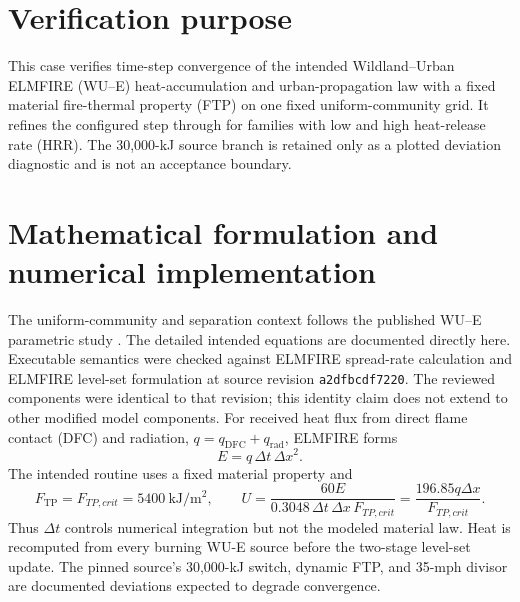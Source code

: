 \section{Verification purpose}

This case verifies time-step convergence of the intended Wildland--Urban ELMFIRE (WU--E) heat-accumulation and urban-propagation law with a fixed material fire-thermal property (FTP) on one fixed uniform-community grid. It refines the configured step through \TimeStepSet{} for families with low and high heat-release rate (HRR). The 30,000-kJ source branch is retained only as a plotted deviation diagnostic and is not an acceptance boundary.

\ReportOverview

\section{Mathematical formulation and numerical implementation}
The uniform-community and separation context follows the published WU--E
parametric study \cite{PurnomoIJWF2024}. The detailed intended equations are
documented directly here.
Executable semantics were checked against ELMFIRE spread-rate calculation
and ELMFIRE level-set formulation at source revision
\texttt{a2dfbcdf7220}.  The reviewed components were identical to that revision; this identity claim
does not extend to other modified model components.
For received heat flux from direct flame contact (DFC) and radiation, $q=q_{\mathrm{DFC}}+q_{\mathrm{rad}}$, ELMFIRE forms
\begin{equation}
 E=q\,\Delta t\,\Delta x^2.
\end{equation}
The intended routine uses a fixed material property and
\begin{equation}
 F_{\mathrm{TP}}=F_{TP,crit}=5400~\si{\kilo\joule\per\square\metre},\qquad
 U=\frac{60E}{0.3048\,\Delta t\,\Delta x\,F_{TP,crit}}
  =\frac{196.85q\Delta x}{F_{TP,crit}}.
\end{equation}
Thus $\Delta t$ controls numerical integration but not the modeled material
law. Heat is recomputed from every burning WU-E source before the two-stage
level-set update. The pinned source's 30,000-kJ switch, dynamic FTP, and
35-mph divisor are documented deviations expected to degrade convergence.

